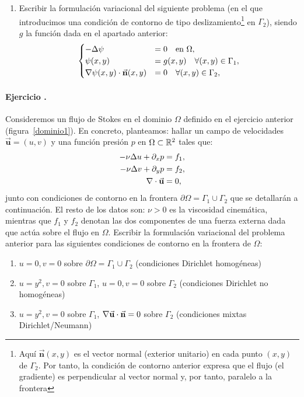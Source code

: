 \documentclass[11pt]{article}
\newcounter{actividad}
\newcommand{\actividad}[1]{
\stepcounter{actividad}
\paragraph*{Ejercicio \theactividad. #1}
}
\newcommand{\Vector}[1]{\ensuremath{\vec{\mathbf{#1}}}}
\renewcommand{\uu}{\Vector{u}}
\renewcommand{\nn}{\Vector{n}}
\begin{document}
\begin{enumerate}
\item Escribir la formulación variacional del siguiente problema (en
  el que introducimos una condición de contorno de tipo
  deslizamiento\footnote{ Aquí $\nn(x,y)$ es el vector normal
    (exterior unitario) en cada punto $(x,y)$ de $\Gamma_2$. Por
    tanto, la condición de contorno anterior expresa que el flujo (el
    gradiente) es perpendicular al vector normal y, por tanto,
    paralelo a la frontera} en $\Gamma_2$), siendo $g$ la función dada en el
  apartado anterior:
\begin{equation*}
\begin{cases}
-\Delta\psi &=0 \quad\text{en } \Omega,
\\
\psi(x,y)&=g(x,y) \quad\forall (x,y)\in\Gamma_1,
\\
\grad\psi(x,y)\cdot\nn(x,y)&=0 \quad\forall (x,y)\in\Gamma_2,
\end{cases}
\end{equation*}
\end{enumerate}


\actividad{} Consideremos un flujo de Stokes en el dominio $\Omega$
definido en el ejercicio anterior (figura~\ref{dominio1}). En
concreto, planteamos: hallar un campo de velocidades $\uu=(u,v)$ y una
función presión $p$ en $\Omega\subset{\mathbb R}^2$ tales que:
\begin{align*}
- \nu\Delta u + \dx p &= f_1,
\\
- \nu\Delta v + \dy p &= f_2,
\\
\div{\uu} &  = 0,
\end{align*}
junto con condiciones de contorno en la frontera
$\partial\Omega=\Gamma_1\cup\Gamma_2$ que se detallarán a continuación. El resto de los datos son:
$\nu>0$ es la viscosidad cinemática, mientras que $f_1$ y $f_2$
denotan las dos componentes de una fuerza externa dada que
actúa sobre el flujo en $\Omega$.
%
Escribir la formulación variacional del problema anterior para
las siguientes condiciones de contorno en la frontera de $\Omega$:
\begin{enumerate}
\item $u=0, v=0$ sobre $\partial\Omega=\Gamma_1\cup\Gamma_2$ (condiciones Dirichlet homogéneas)
\item $u=y^2, v=0$ sobre $\Gamma_1$,  $u=0, v=0$ sobre $\Gamma_2$ (condiciones Dirichlet no homogéneas)
\item $u=y^2, v=0$ sobre $\Gamma_1$, $\grad\uu\cdot\nn=0$ sobre $\Gamma_2$ (condiciones mixtas Dirichlet/Neumann)
\end{enumerate}
\end{document}
